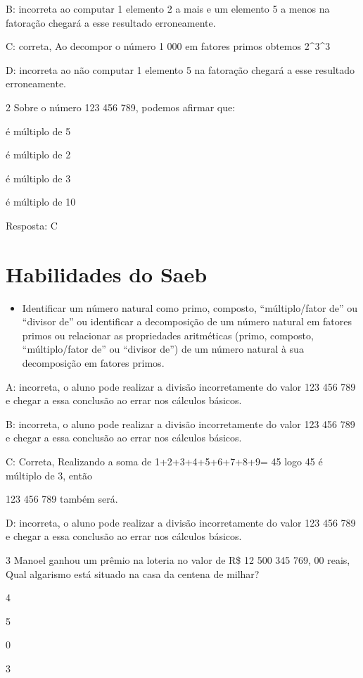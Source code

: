 B: incorreta ao computar 1 elemento 2 a mais e um elemento 5 a menos na
fatoração chegará a esse resultado erroneamente.

C: correta, Ao decompor o número 1 000 em fatores primos obtemos 2^3^3

D: incorreta ao não computar 1 elemento 5 na fatoração chegará a esse
resultado erroneamente.

\num{2} Sobre o número 123 456 789, podemos afirmar que:

\item é múltiplo de 5
\item é múltiplo de 2
\item é múltiplo de 3
\item é múltiplo de 10

Resposta: C

\section{Habilidades do Saeb}

\begin{itemize}
\item 
  Identificar um número natural como primo, composto, ``múltiplo/fator
  de'' ou ``divisor de'' ou identificar a decomposição de um número
  natural em fatores primos ou relacionar as propriedades aritméticas
  (primo, composto, ``múltiplo/fator de'' ou ``divisor de'') de um 
  número natural à sua decomposição em fatores primos.
\end{itemize}

A: incorreta, o aluno pode realizar a divisão incorretamente do valor
123 456 789 e chegar a essa conclusão ao errar nos cálculos básicos.

B: incorreta, o aluno pode realizar a divisão incorretamente do valor
123 456 789 e chegar a essa conclusão ao errar nos cálculos básicos.

C: Correta, Realizando a soma de 1+2+3+4+5+6+7+8+9= 45 logo 45 é
múltiplo de 3, então

123 456 789 também será.

D: incorreta, o aluno pode realizar a divisão incorretamente do valor
123 456 789 e chegar a essa conclusão ao errar nos cálculos básicos.

\num{3} Manoel ganhou um prêmio na loteria no valor de R\$ 12 500 345 769, 00
reais, Qual algarismo está situado na casa da centena de milhar?

\item 4
\item 5
\item 0
\item 3

